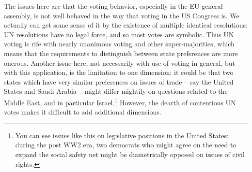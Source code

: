 The issues here are that the voting behavior, especially in the EU general assembly, is not well behaved in the way that voting in the US Congress is. We actually can get some sense of it by the existence of multiple identical resolutions: UN resolutions have no legal force, and so most votes are symbolic. Thus UN voting is rife with nearly unanimous voting and other super-majorities, which means that the requirements to distinguish between state preferences are more onerous. Another issue here, not necessarily with use of voting in general, but with this application, is the limitation to one dimension: it could be that two states which have very similar preferences on issues of trade -- say the United States and  Saudi Arabia -- might differ mightily on questions related to the Middle East, and in particular Israel.\footnote{You can see issues like this on legislative positions in the United States: during the post WW2 era, two democrats who might agree on the need to expand the social safety net might be diametrically opposed on issues of civil rights.} However, the dearth of contentious UN votes makes it difficult to add additional dimensions.
